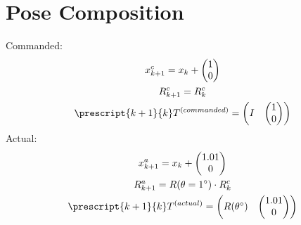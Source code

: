 \documentclass[a4paper]{scrreprt}
\begin{document}
\section{Pose Composition}\label{pose-composition}
Commanded:
\begin{gather}
x^c_{k+1} = x_k + \begin{pmatrix} 1 \\ 0 \end{pmatrix} \\
R^c_{k+1} = R^c_k \\
\prescript{k+1}{k}T^{(commanded)} = \begin{pmatrix}
I & \begin{pmatrix}
1 \\ 0
\end{pmatrix} 
\end{pmatrix}
\end{gather}
Actual:
\begin{gather}
	x^a_{k+1} = x_k + \begin{pmatrix} 1.01 \\ 0 \end{pmatrix} \\
	R^a_{k+1} = R(\theta = 1^{\circ}) \cdot R^c_k \\
	\prescript{k+1}{k}T^{(actual)} = \begin{pmatrix}
	R(\theta^{\circ}) & \begin{pmatrix}
	1.01 \\ 0
	\end{pmatrix} 
	\end{pmatrix}
\end{gather}
\end{document}
